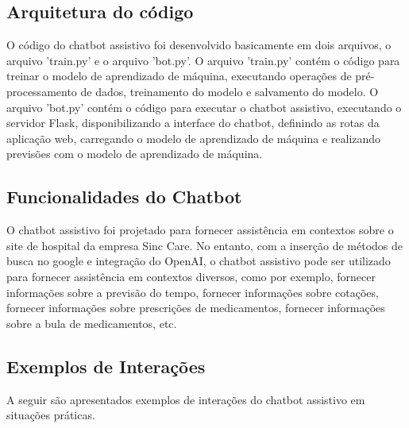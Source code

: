 \documentclass[conference]{IEEEtran}
\begin{document}
\subsection {Arquitetura do código}
O código do chatbot assistivo foi desenvolvido basicamente em dois arquivos,
o arquivo 'train.py' e o arquivo 'bot.py'.
O arquivo 'train.py' contém o código para treinar o modelo de aprendizado de máquina,
executando operações de pré-processamento de dados, treinamento do modelo e salvamento do modelo.
O arquivo 'bot.py' contém o código para executar o chatbot assistivo,
executando o servidor Flask, disponibilizando a interface do chatbot, definindo as rotas da aplicação web,
carregando o modelo de aprendizado de máquina e realizando previsões com o modelo de aprendizado de máquina.

\subsection{Funcionalidades do Chatbot}
O chatbot assistivo foi projetado para fornecer assistência em contextos sobre o site de hospital da empresa Sinc Care.
No entanto, com a inserção de métodos de busca no google e integração do OpenAI, o chatbot assistivo pode ser utilizado
para fornecer assistência em contextos diversos, como por exemplo, fornecer informações sobre a previsão do tempo,
fornecer informações sobre cotações, fornecer informações sobre prescrições de medicamentos, fornecer informações sobre
a bula de medicamentos, etc. 

\subsection{Exemplos de Interações}
A seguir são apresentados exemplos de interações do chatbot assistivo em situações práticas.
\end{document}
